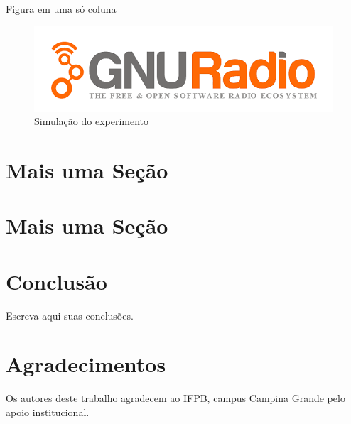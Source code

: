\documentclass[journal]{IEEEtran}
\begin{document}
Figura em uma só coluna
\begin{figure}[!ht]
	\centering
	\includegraphics[scale=0.5]{gnuradio}
	\caption{Simulação do experimento}
\end{figure}


\section{Mais uma Seção}
\lipsum[1-2]

\section{Mais uma Seção}
\lipsum[1-5]


\section{Conclusão}
Escreva aqui suas conclusões. \lipsum[1-2]

\section*{Agradecimentos}

Os autores deste trabalho agradecem ao IFPB, campus Campina Grande pelo apoio institucional. 



\end{document}
